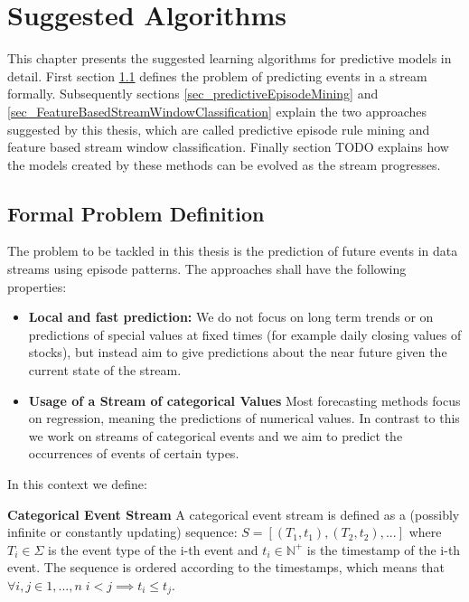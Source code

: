\chapter{Suggested Algorithms}
\label{chapter_solutions}

\ifpdf
    \graphicspath{{Chapter4/Figs/Raster/}{Chapter4/Figs/PDF/}{Chapter4/Figs/}}
\else
    \graphicspath{{Chapter4/Figs/Vector/}{Chapter4/Figs/}}
\fi

This chapter presents the suggested learning algorithms for predictive models in detail. First section \ref{sec_formalProblemDef} defines the problem of predicting events in a stream formally. Subsequently sections \ref{sec_predictiveEpisodeMining} and \ref{sec_FeatureBasedStreamWindowClassification} explain the two approaches suggested by this thesis, which are called predictive episode rule mining and feature based stream window classification. Finally section TODO explains how the models created by these methods can be evolved as the stream progresses.

\section{Formal Problem Definition}
\label{sec_formalProblemDef}
The problem to be tackled in this thesis is the prediction of future events in data streams using episode patterns. The approaches shall have the following properties:

\begin{itemize}
	\item \textbf{Local and fast prediction:} We do not focus on long term trends or on predictions of special values at fixed times (for example daily closing values of stocks), but instead aim to give predictions about the near future given the current state of the stream.
	\item \textbf{Usage of a Stream of categorical Values} Most forecasting methods focus on regression, meaning the predictions of numerical values. In contrast to this we work on streams of categorical events and we aim to predict the occurrences of events of certain types.
\end{itemize}

In this context we define:

\begin{mydef}
\textbf{Categorical Event Stream} A categorical event stream is defined as a (possibly infinite or constantly updating) sequence: $S = [ (T_1,t_1),(T_2,t_2),... ] $ where $T_i \in \Sigma$ is the event type of the i-th event and $t_i \in \mathbb{N}^+$ is the timestamp of the i-th event. The sequence is ordered according to the timestamps, which means that $\forall i,j \in {1,...,n} \; i<j \implies t_i \leq t_j$.
\end{mydef}

